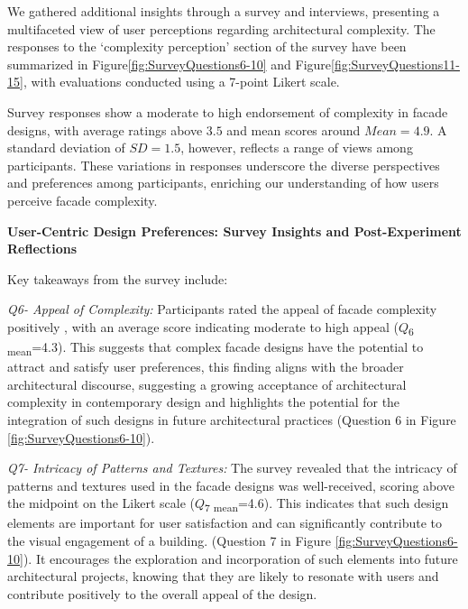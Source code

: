 %    


We gathered additional insights through a survey and interviews, presenting a multifaceted view of user perceptions regarding architectural complexity.
The responses to the `complexity perception' section of the survey have been summarized in Figure\ref{fig:SurveyQuestions6-10} and Figure\ref{fig:SurveyQuestions11-15}, with evaluations conducted using a 7-point Likert scale.


Survey responses show a moderate to high endorsement of complexity in facade designs, with average ratings above \(3.5\) and mean scores around \(Mean = 4.9\).
A standard deviation of \(SD = 1.5\), however, reflects a range of views among participants.
These variations in responses underscore the diverse perspectives and preferences among participants, enriching our understanding of how users perceive facade complexity.

\textbf{User-Centric Design Preferences: Survey Insights and Post-Experiment Reflections}

Key takeaways from the survey include:


\textit{Q6- Appeal of Complexity:}
Participants rated the appeal of facade complexity positively , with an average score indicating moderate to high appeal (\(Q\)\textsubscript{\small{6 mean}}=4.3).
This suggests that complex facade designs have the potential to attract and satisfy user preferences, this finding aligns with the broader architectural discourse, suggesting a growing acceptance of architectural complexity in contemporary design and highlights the potential for the integration of such designs in future architectural practices (Question 6 in Figure \ref{fig:SurveyQuestions6-10}).

\textit{Q7-  Intricacy of Patterns and Textures:}
The survey revealed that the intricacy of patterns and textures used in the facade designs was well-received, scoring above the midpoint on the Likert scale (\(Q\)\textsubscript{\small{7 mean}}=4.6).
This indicates that such design elements are important for user satisfaction and can significantly contribute to the visual engagement of a building.
(Question 7 in Figure \ref{fig:SurveyQuestions6-10}).
It encourages the exploration and incorporation of such elements into future architectural projects, knowing that they are likely to resonate with users and contribute positively to the overall appeal of the design.

